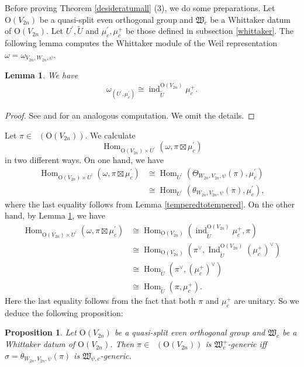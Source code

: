 \documentclass[article]{article}
\numberwithin{equation}{section}
\newtheorem{lemma}[theorem]{Lemma}
\newtheorem{proposition}[theorem]{Proposition}
\theoremstyle{definition}
\DeclareMathOperator{\Hom}{Hom}
\DeclareMathOperator{\Ind}{Ind}
\DeclareMathOperator{\ind}{ind}
\DeclareMathOperator{\Irrt}{Irr_{temp}}
\begin{document}
Before proving Theorem \ref{desideratumall} (3), we do some preparations. Let $\mathrm O(V_{2n})$ be a quasi-split even orthogonal group and $\mathfrak W_c$ be a Whittaker datum of $\mathrm O(V_{2n})$. Let $U^\prime, \widetilde{U}$ and $\mu^\prime_c, \mu_c^+$ be those defined in subsection \ref{whittaker}. The following lemma computes the Whittaker module of the Weil representation $\omega=\omega_{V_{2n},W_{2n},\psi}$.  
\begin{lemma}\label{Jacquetmodule}
	 We have 
	\begin{align*}
	\omega_{(U^\prime,\mu^\prime_c)}\cong \ind_{\widetilde{U}}^{\mathrm O(V_{2n})}\mu_c^+. 
	\end{align*}
\end{lemma}
\begin{proof}
	See \cite{MR1454260} and \cite{MR1738175} for an analogous computation. We omit the details. 
\end{proof}
Let $\pi\in \Irrt(\mathrm O(V_{2n}))$. We calculate $$\Hom_{\mathrm O(V_{2n})\times U^\prime}(\omega, \pi\boxtimes \mu_c^\prime)$$ in two different ways. On one hand, we have 
\begin{align*}
\Hom_{\mathrm O(V_{2n})\times U^\prime}(\omega, \pi\boxtimes \mu_c^\prime)&\cong \Hom_{U^\prime}(\Theta_{W_{2n},V_{2n}, \psi}(\pi), \mu_c^\prime)\\
&\cong  \Hom_{U^\prime}(\theta_{W_{2n},V_{2n}, \psi}(\pi), \mu_c^\prime),
\end{align*}
where the last equality follows from Lemma \ref{temperedtotempered}. On the other hand, by Lemma \ref{Jacquetmodule}, we have 
\begin{align*}
\Hom_{\mathrm O(V_{2n})\times U^\prime}(\omega, \pi\boxtimes \mu_c^\prime)&\cong \Hom_{\mathrm O(V_{2n})}\left(\ind_{\widetilde{U}}^{\mathrm O(V_{2n})}\mu_c^+, \pi\right)\\
&\cong \Hom_{\mathrm O(V_{2n})}\left(\pi^\vee, \Ind_{\widetilde{U}}^{\mathrm O(V_{2n})}(\mu_c^+)^\vee\right)\\
&\cong \Hom_{\widetilde{U}}\left(\pi^\vee, (\mu_c^+)^\vee\right)\\
&\cong \Hom_{\widetilde{U}}\left(\pi, \mu_c^+\right).
\end{align*}
Here the last equality follows from the fact that both $\pi$ and $\mu_{c}^+$ are unitary. So we deduce the following proposition:  
\begin{proposition}\label{generic to generic}
	Let $\mathrm O(V_{2n})$ be a quasi-split even orthogonal group and $\mathfrak W_c$ be a Whittaker datum of $\mathrm O(V_{2n})$. Then $\pi\in \Irrt(\mathrm O(V_{2n}))$ is $\mathfrak W_c^+$-generic iff $\sigma=\theta_{W_{2n},V_{2n},\psi}(\pi)$ is $\mathfrak W_{\psi,c}$-generic.   	
\end{proposition}
\end{document}
